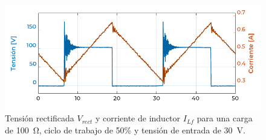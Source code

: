 \lipsum[1]\\

\begin{figure}[h]
    \centering
    \includegraphics[scale=1.1]{Imagenes/Grafico DC50 RL100 VIN30.pdf}
    \caption{Tensión rectificada $V_{rect}$ y corriente de inductor $I_{Lf}$ para una carga de \SI[]{100}{\ohm}, ciclo de trabajo de 50\% y tensión de entrada de \SI[]{30}{\volt}.}
    \label{dc50_rL100_vin30}
\end{figure}

\lipsum[2]\\

\afterpage{\blankpage}\newpage